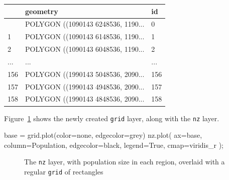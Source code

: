 \documentclass[
  letterpaper,
]{krantz}
\newenvironment{Shaded}{\begin{snugshade}}{\end{snugshade}}
\newcommand{\NormalTok}[1]{\textcolor[rgb]{0.00,0.23,0.31}{#1}}
\newcommand{\OperatorTok}[1]{\textcolor[rgb]{0.37,0.37,0.37}{#1}}
\newcommand{\StringTok}[1]{\textcolor[rgb]{0.13,0.47,0.30}{#1}}
\newcommand{\VariableTok}[1]{\textcolor[rgb]{0.07,0.07,0.07}{#1}}
\begin{document}
\begin{longtable}[]{@{}lll@{}}
\toprule\noalign{}
& geometry & id \\
\midrule\noalign{}
\endhead
\bottomrule\noalign{}
\endlastfoot
0 & POLYGON ((1090143 6248536, 1190... & 0 \\
1 & POLYGON ((1090143 6148536, 1190... & 1 \\
2 & POLYGON ((1090143 6048536, 1190... & 2 \\
... & ... & ... \\
156 & POLYGON ((1990143 5048536, 2090... & 156 \\
157 & POLYGON ((1990143 4948536, 2090... & 157 \\
158 & POLYGON ((1990143 4848536, 2090... & 158 \\
\end{longtable}

Figure~\ref{fig-nz-and-grid} shows the newly created \texttt{grid}
layer, along with the \texttt{nz} layer.

\begin{Shaded}
\begin{Highlighting}[]
\NormalTok{base }\OperatorTok{=}\NormalTok{ grid.plot(color}\OperatorTok{=}\StringTok{\textquotesingle{}none\textquotesingle{}}\NormalTok{, edgecolor}\OperatorTok{=}\StringTok{\textquotesingle{}grey\textquotesingle{}}\NormalTok{)}
\NormalTok{nz.plot(}
\NormalTok{    ax}\OperatorTok{=}\NormalTok{base, }
\NormalTok{    column}\OperatorTok{=}\StringTok{\textquotesingle{}Population\textquotesingle{}}\NormalTok{, }
\NormalTok{    edgecolor}\OperatorTok{=}\StringTok{\textquotesingle{}black\textquotesingle{}}\NormalTok{, }
\NormalTok{    legend}\OperatorTok{=}\VariableTok{True}\NormalTok{, }
\NormalTok{    cmap}\OperatorTok{=}\StringTok{\textquotesingle{}viridis\_r\textquotesingle{}}
\NormalTok{)}\OperatorTok{;}
\end{Highlighting}
\end{Shaded}

\begin{figure}[H]


\caption{\label{fig-nz-and-grid}The \texttt{nz} layer, with population
size in each region, overlaid with a regular \texttt{grid} of
rectangles}

\end{figure}%
\end{document}
